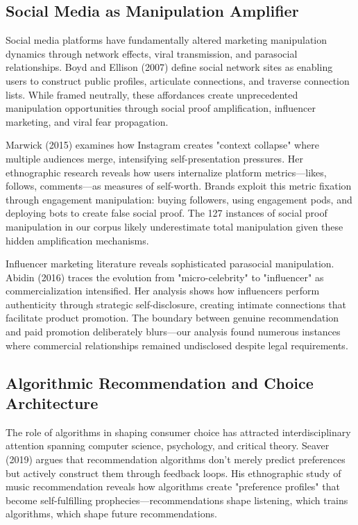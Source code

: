 \subsection{Social Media as Manipulation Amplifier}

Social media platforms have fundamentally altered marketing manipulation dynamics through network effects, viral transmission, and parasocial relationships. Boyd and Ellison (2007) define social network sites as enabling users to construct public profiles, articulate connections, and traverse connection lists. While framed neutrally, these affordances create unprecedented manipulation opportunities through social proof amplification, influencer marketing, and viral fear propagation.

Marwick (2015) examines how Instagram creates "context collapse" where multiple audiences merge, intensifying self-presentation pressures. Her ethnographic research reveals how users internalize platform metrics—likes, follows, comments—as measures of self-worth. Brands exploit this metric fixation through engagement manipulation: buying followers, using engagement pods, and deploying bots to create false social proof. The 127 instances of social proof manipulation in our corpus likely underestimate total manipulation given these hidden amplification mechanisms.

Influencer marketing literature reveals sophisticated parasocial manipulation. Abidin (2016) traces the evolution from "micro-celebrity" to "influencer" as commercialization intensified. Her analysis shows how influencers perform authenticity through strategic self-disclosure, creating intimate connections that facilitate product promotion. The boundary between genuine recommendation and paid promotion deliberately blurs—our analysis found numerous instances where commercial relationships remained undisclosed despite legal requirements.

\subsection{Algorithmic Recommendation and Choice Architecture}

The role of algorithms in shaping consumer choice has attracted interdisciplinary attention spanning computer science, psychology, and critical theory. Seaver (2019) argues that recommendation algorithms don't merely predict preferences but actively construct them through feedback loops. His ethnographic study of music recommendation reveals how algorithms create "preference profiles" that become self-fulfilling prophecies—recommendations shape listening, which trains algorithms, which shape future recommendations.

